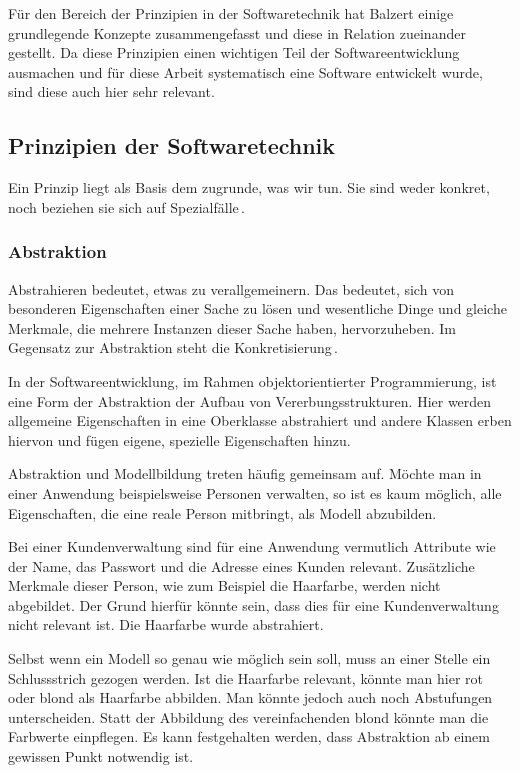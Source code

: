 \documentclass[12pt,oneside,a4paper,parskip]{scrbook}
\begin{document}
Für den Bereich der Prinzipien in der Softwaretechnik hat Balzert einige grundlegende Konzepte zusammengefasst und diese in Relation zueinander gestellt. Da diese Prinzipien einen wichtigen Teil der Softwareentwicklung ausmachen und für diese Arbeit systematisch eine Software entwickelt wurde, sind diese auch hier sehr relevant.

\subsection{Prinzipien der Softwaretechnik}

Ein Prinzip liegt als Basis dem zugrunde, was wir tun. Sie sind weder konkret, noch beziehen sie sich auf Spezialfälle\,\cite[S. 25]{balzert2009a}.

\subsubsection{Abstraktion}

Abstrahieren bedeutet, etwas zu verallgemeinern. Das bedeutet, sich von besonderen Eigenschaften einer Sache zu lösen und wesentliche Dinge und gleiche Merkmale, die mehrere Instanzen dieser Sache haben, hervorzuheben. Im Gegensatz zur Abstraktion steht die Konkretisierung\,\cite[S. 26]{balzert2009a}.

In der Softwareentwicklung, im Rahmen objektorientierter Programmierung, ist eine Form der Abstraktion der Aufbau von Vererbungsstrukturen. Hier werden allgemeine Eigenschaften in eine Oberklasse abstrahiert und andere Klassen erben hiervon und fügen eigene, spezielle Eigenschaften hinzu.

Abstraktion und Modellbildung treten häufig gemeinsam auf. Möchte man in einer Anwendung beispielsweise Personen verwalten, so ist es kaum möglich, alle Eigenschaften, die eine reale Person mitbringt, als Modell abzubilden.

Bei einer Kundenverwaltung sind für eine Anwendung vermutlich Attribute wie der Name, das Passwort und die Adresse eines Kunden relevant. Zusätzliche Merkmale dieser Person, wie zum Beispiel die Haarfarbe, werden nicht abgebildet. Der Grund hierfür könnte sein, dass dies für eine Kundenverwaltung nicht relevant ist. Die Haarfarbe wurde abstrahiert.

Selbst wenn ein Modell so genau wie möglich sein soll, muss an einer Stelle ein Schlussstrich gezogen werden. Ist die Haarfarbe relevant, könnte man hier rot oder blond als Haarfarbe abbilden. Man könnte jedoch auch noch Abstufungen unterscheiden. Statt der Abbildung des vereinfachenden blond könnte man die Farbwerte einpflegen. Es kann festgehalten werden, dass Abstraktion ab einem gewissen Punkt notwendig ist.
\end{document}
